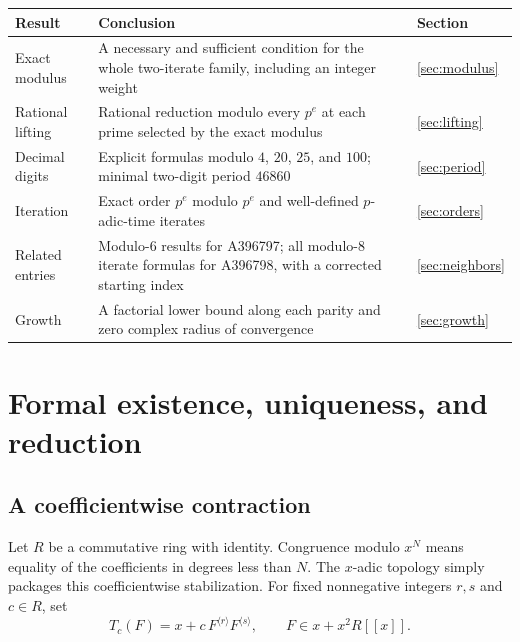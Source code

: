 \documentclass[11pt,letterpaper]{article}
\theoremstyle{definition}
\theoremstyle{remark}
\newcommand{\iter}[2]{#1^{\langle #2\rangle}}
\begin{document}
\begin{center}
\begin{tabular}{@{}p{}p{}p{}@{}}
\toprule
Result & Conclusion & Section\\
\midrule
Exact modulus & A necessary and sufficient condition for the whole
 two-iterate family, including an integer weight & \ref{sec:modulus}\\[3pt]
Rational lifting & Rational reduction modulo every $p^e$ at each
 prime selected by the exact modulus & \ref{sec:lifting}\\[3pt]
Decimal digits & Explicit formulas modulo $4$, $20$, $25$, and $100$;
 minimal two-digit period $46860$ & \ref{sec:period}\\[3pt]
Iteration & Exact order $p^e$ modulo $p^e$ and well-defined
 $p$-adic-time iterates & \ref{sec:orders}\\[3pt]
Related entries & Modulo-$6$ results for A396797; all modulo-$8$
 iterate formulas for A396798, with a corrected starting index
 & \ref{sec:neighbors}\\[3pt]
Growth & A factorial lower bound along each parity and zero
 complex radius of convergence & \ref{sec:growth}\\
\bottomrule
\end{tabular}
\end{center}

\section{Formal existence, uniqueness, and reduction}\label{sec:formal}

\subsection{A coefficientwise contraction}
Let $R$ be a commutative ring with identity.  Congruence modulo $x^N$
means equality of the coefficients in degrees less than $N$.  The
$x$-adic topology simply packages this coefficientwise stabilization.
For fixed nonnegative integers $r,s$ and $c\in R$, set
\begin{equation}\label{eq:T}
 T_c(F)=x+c\,\iter{F}{r}\iter{F}{s},\qquad F\in x+x^2R[[x]].
\end{equation}
\end{document}
